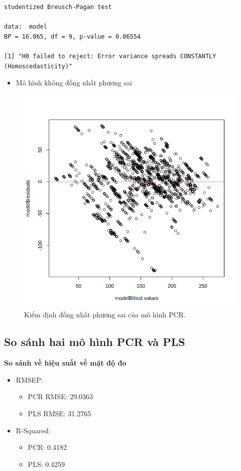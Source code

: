 \begin{lstlisting}
studentized Breusch-Pagan test

data:  model
BP = 16.065, df = 9, p-value = 0.06554

[1] "H0 failed to reject: Error variance spreads CONSTANTLY (Homoscedasticity)"
\end{lstlisting}
\begin{itemize}
    \item Mô hình không đồng nhất phương sai
\end{itemize}
\begin{figure}[H]
    \centering
    \includegraphics[width=0.75\columnwidth]{csm_figures/pls_homo_test.png}
    \caption{Kiểm định đồng nhất phương sai của mô hình PCR.}
    \label{fig:pls_homo_test}
\end{figure}

\subsection{So sánh hai mô hình PCR và PLS}

\textbf{So sánh về hiệu suất về mặt độ đo} 
\begin{itemize}
    \item RMSEP: 
    \begin{itemize}
        \item PCR RMSE: 29.0363
        \item PLS RMSE: 31.2765
    \end{itemize}
    \item R-Squared:
    \begin{itemize}
        \item PCR: 0.4182
        \item PLS:  0.4259
    \end{itemize}
\end{itemize}

